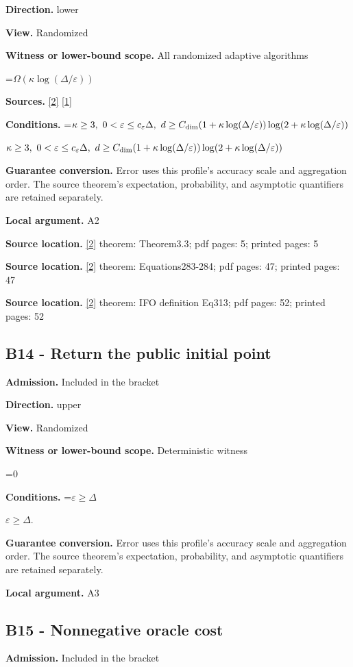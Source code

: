\documentclass[10pt,a4paper]{article}
\newcommand{\AtlasMath}[1]{\par\begingroup\centering\setbox0=\hbox{$\displaystyle #1$}\ifdim\wd0>1.4\linewidth\typeout{ATLAS WIDE FORMULA: \the\wd0}\fi\ifdim\wd0>\linewidth\resizebox{\linewidth}{!}{\box0}\else\box0\fi\par\endgroup}
\newcommand{\AtlasInlineMath}[1]{\begingroup\setbox0=\hbox{$#1$}\ifdim\wd0>.4\linewidth\endgroup\AtlasMath{#1}\else\endgroup$#1$\fi}
\begin{document}
\textbf{Direction.} lower

\textbf{View.} Randomized

\textbf{Witness or lower-bound scope.} All randomized adaptive algorithms

\AtlasMath{\Omega(\kappa\log(\Delta/\varepsilon))}
\textbf{Sources.} \href{https://arxiv.org/html/2609.00045v3}{[2]} \href{https://arxiv.org/html/2610.00345v1}{[1]}

\textbf{Conditions.} \AtlasInlineMath{\kappa\ge3,\ 0<\varepsilon\le c_\varepsilon\Delta,\ d\ge C_{\rm dim}(1+\kappa\log(\Delta/\varepsilon))\log(2+\kappa\log(\Delta/\varepsilon))}

\textbf{Guarantee conversion.} Error uses this profile's accuracy scale and aggregation order. The source theorem's expectation, probability, and asymptotic quantifiers are retained separately.

\textbf{Local argument.} A2

\textbf{Source location.} \href{https://arxiv.org/html/2609.00045v3}{[2]} theorem: Theorem3.3; pdf pages: 5; printed pages: 5

\textbf{Source location.} \href{https://arxiv.org/html/2609.00045v3}{[2]} theorem: Equations283-284; pdf pages: 47; printed pages: 47

\textbf{Source location.} \href{https://arxiv.org/html/2609.00045v3}{[2]} theorem: IFO definition Eq313; pdf pages: 52; printed pages: 52

\subsection{B14 - Return the public initial point}
\textbf{Admission.} Included in the bracket

\textbf{Direction.} upper

\textbf{View.} Randomized

\textbf{Witness or lower-bound scope.} Deterministic witness

\AtlasMath{0}
\textbf{Conditions.} \AtlasInlineMath{\varepsilon\ge\Delta}.

\textbf{Guarantee conversion.} Error uses this profile's accuracy scale and aggregation order. The source theorem's expectation, probability, and asymptotic quantifiers are retained separately.

\textbf{Local argument.} A3

\subsection{B15 - Nonnegative oracle cost}
\textbf{Admission.} Included in the bracket
\end{document}

